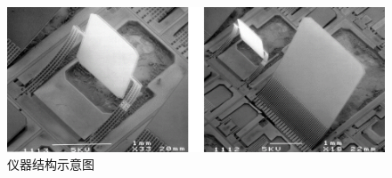 \begin{frame}[c]
    \begin{figure}[!htb] %
        \centering %
        \includegraphics[width=.8\textwidth]{figures/Microspectrometer based on a tunable optical filter of porous silicon_2.png} %
        \caption{仪器结构示意图} %
    \end{figure}
\end{frame}

